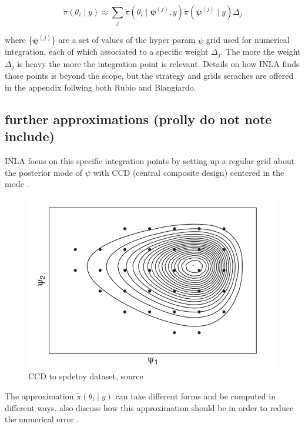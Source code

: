 \documentclass[
  12pt,
  a4paper,
  oneside]{book}
\theoremstyle{definition}
\theoremstyle{definition}
\theoremstyle{definition}
\theoremstyle{remark}
\begin{document}
\[
\tilde{\pi}\left(\theta_{i} \mid y\right) \approx \sum_{j} \tilde{\pi}\left(\theta_{i} \mid \boldsymbol{\psi}^{(j)}, y\right) \tilde{\pi}\left(\boldsymbol{\psi}^{(j)} \mid y\right) \Delta_{j}
\]

where \{\(\boldsymbol{\psi}^{(j)}\)\} are a set of values of the hyper param \(\psi\) grid used for numerical integration, each of which associated to a specific weight \(\Delta_{j}\). The more the weight \(\Delta_{j}\) is heavy the more the integration point is relevant. Details on how INLA finds those points is beyond the scope, but the strategy and grids seraches are offered in the appendix follwing both Rubio and Blangiardo.

\hypertarget{further-approximations-prolly-do-not-note-include}{%
\subsection{further approximations (prolly do not note include)}\label{further-approximations-prolly-do-not-note-include}}

INLA focus on this specific integration points by setting up a regular grid about the posterior mode of \(\psi\) with CCD (central composite design) centered in the mode \citep{Bayesian_INLA_Rubio}.

\begin{figure}
\centering
\includegraphics{images/CCDapplied.PNG}
\caption{CCD to spdetoy dataset, source \citet{Blangiardo-Cameletti}}
\end{figure}

The approximation \(\tilde{\pi}\left(\theta_{i} \mid y\right)\) can take different forms and be computed in different ways. \citet{Rue2009} also discuss how this approximation should be in order to reduce the numerical error \citep{Krainski-Rubio}.
\end{document}

